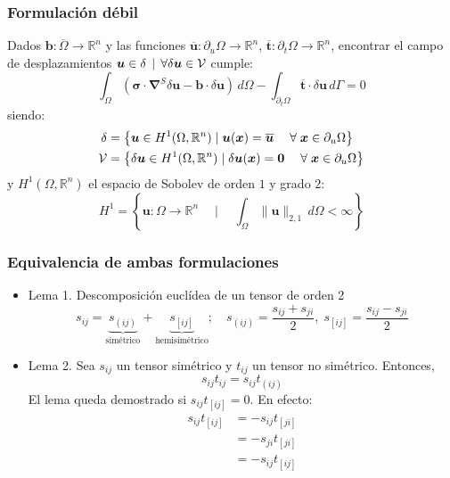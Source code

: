 \documentclass{beamer}
\newcommand{\norm}[1]{\lVert #1 \rVert}
\begin{document}
\begin{frame}
\frametitle{Formulación débil}
Dados $\bm{b}:\overline{\Omega}\rightarrow \mathbb{R}^n$ y las funciones
$\overline{\bm{u}}:\partial_u \Omega \rightarrow \mathbb{R}^n$,
$\overline{\bm{t}}:\partial_t \Omega \rightarrow \mathbb{R}^n$,
encontrar el campo de
desplazamientos $\bm{u}\in \delta\,\mid \, \forall \delta \bm{u} \in {\cal V}$
cumple:
\begin{equation}
\int_{\Omega}\left( \bm{\sigma}\cdot \bm{\nabla}^{S}\delta \bm{u}
-\bm{b} \cdot \delta \bm{u} \right) \, d \Omega
-\int_{\partial_t \Omega} \overline{\bm{t}}\cdot
\delta \bm{u} \, d \Gamma =0 \label{formdeb}
\end{equation}
siendo:
\begin{align}
\delta&=\left\{
\bm{u} \in H^1(\Omega,\mathbb{R}^n) \mid \bm{u}(\bm{x})=\overline{\bm{u}}
\; \quad \forall \; \bm{x} \in \partial_u \Omega \right\} \label{trial} \\
{\cal V}&=\left\{
\delta \bm{u} \in H^1(\Omega,\mathbb{R}^n) \mid \delta \bm{u}(\bm{x})=\bm
{0} \; \quad \forall \; \bm{x} \in \partial_u \Omega \right\} \label{weight}
\end{align}
y $H^1(\Omega,\mathbb{R}^n)$ el espacio de Sobolev de orden $1$ y grado $2$:
$$
H^1=\left\{ \bm{u}:\Omega \rightarrow \mathbb{R}^n \quad \mid \quad
\int_{\Omega} \norm{\bm{u}}_{2,1} \, d\Omega <\infty \right\}
$$
\end{frame}
\begin{frame}
\frametitle{Equivalencia de ambas formulaciones}
\begin{itemize}
\item Lema 1. Descomposición euclídea de un tensor de orden 2
\begin{equation*}
s_{ij}=\underbrace{s_{(ij)}}_{\textrm{simétrico}}+
       \underbrace{s_{[ij]}}_{\textrm{hemisimétrico}};
\quad
s_{(ij)}=\frac{s_{ij}+s_{ji}}{2},
\;
s_{[ij]}=\frac{s_{ij}-s_{ji}}{2}
\end{equation*}
\item Lema 2. Sea $s_{ij}$ un tensor simétrico y $t_{ij}$ un tensor no 
simétrico. Entonces,
$$
s_{ij} t_{ij}=s_{ij} t_{(ij)}
$$
El lema queda demostrado si $s_{ij} t_{[ij]}=0$. En efecto:
\begin{align*}
s_{ij} t_{[ij]}&=-s_{ij} t_{[ji]} \\
\mbox{}        &=-s_{ji} t_{[ji]} \\
\mbox{}        &=-s_{ij} t_{[ij]}
\end{align*}
\end{itemize}
\end{frame}
\end{document}
